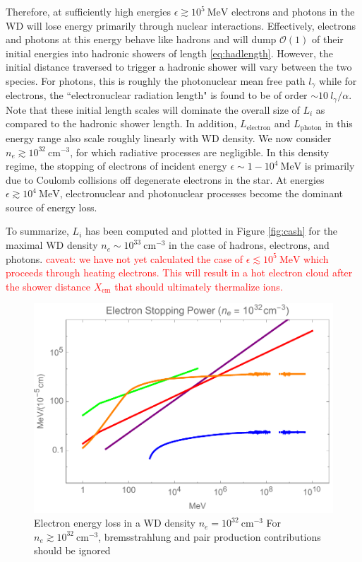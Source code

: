\documentclass[twocolumn,showpacs,preprintnumbers,amsmath,amssymb,prd]{revtex4}
\newcommand{\OO}{\mathcal{O}}
\begin{document}
Therefore, at sufficiently high energies $\epsilon \gtrsim 10^5 ~\text{MeV}$ electrons and photons in the WD will lose energy primarily through nuclear interactions.
Effectively, electrons and photons at this energy behave like hadrons and will dump $\OO(1)$ of their initial energies into hadronic showers of length \eqref{eq:hadlength}.
However, the initial distance traversed to trigger a hadronic shower will vary between the two species.
For photons, this is roughly the photonuclear mean free path $l_\gamma$ while for electrons, the ``electronuclear radiation length" is found to be of order $\sim 10  ~l_\gamma/\alpha$.
Note that these initial length scales will dominate the overall size of $L_i$ as compared to the hadronic shower length.
In addition, $L_\text{electron}$ and $L_\text{photon}$ in this energy range also scale roughly linearly with WD density.
We now consider $n_e \gtrsim 10^{32} ~\text{cm}^{-3}$, for which radiative processes are negligible.
In this density regime, the stopping of electrons of incident energy $\epsilon \sim 1 - 10^4 ~\text{MeV}$ is primarily due to Coulomb collisions off degenerate electrons in the star.
At energies $\epsilon \gtrsim 10^4 ~\text{MeV}$, electronuclear and photonuclear processes become the dominant source of energy loss.


To summarize, $L_i$ has been computed and plotted in Figure \ref{fig:cash} for the maximal WD density $n_e \sim 10^{33} ~\text{cm}^{-3}$ in the case of hadrons, electrons, and photons.
\textcolor{red}{caveat: we have not yet calculated the case of $\epsilon \lesssim 10^{5} ~\text{MeV}$ which proceeds through heating electrons.
This will result in a hot electron cloud after the shower distance $X_\text{em}$ that should ultimately thermalize ions.}

\begin{figure}
\includegraphics[scale=.45]{SPelectron.pdf}
\caption{Electron energy loss in a WD density $n_e = 10^{32} ~\text{cm}^{-3}$ For $n_e \gtrsim 10^{32} ~\text{cm}^{-3}$, bremsstrahlung and pair production contributions should be ignored}
\label{fig:SPelectron}
\end{figure}
\end{document}

